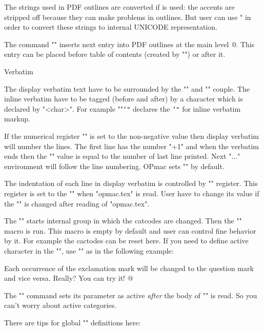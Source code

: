 The strings used in PDF outlines are converted if \csplain{} is used: the
accents are stripped off because they can make problems in outlines. But
user can use " in order to convert these strings to internal
UNICODE representation.

The command "" inserts next entry into PDF outlines at
the main level~0. This entry can be placed before table of contents (created
by "\outlines") or after it.


\sec Verbatim

The display verbatim text have to be surrounded by the "\begtt" and
"\endtt" couple. 
The inline verbatim have to be tagged (before and after) 
by a character which is declared by
"\activettchar<char>". For example "\activettchar"{\tt\char`"} 
declares the
{\tt\char`"} for inline verbatim markup. 

If the numerical register "\ttline" is set to the non-negative value then
display verbatim will number the lines. The first line has the number
"\ttline+1" and when the verbatim ends then the "\ttline" value is equal to the
number of last line printed. Next "\begtt...\endtt" environment will follow
the line numbering. OPmac sets "" by default.

The indentation of each line in display verbatim is controlled by
"\ttindent" register. This register is set to the "\parindent" when
"opmac.tex" is read. User have to change its value if the "\parindent" is
changed after reading of "opmac.tex".

The "\begtt" starts internal group in which the catcodes are changed. Then
the "\tthook" macro is run. This macro is empty by default and user can
control fine behavior by it. For example the cactodes can be reset here. If
you need to define active character in the "\tthook", use "\adef" as in the
following example:

{\def\tthook{\adef@{\string\endtt}}
\begtt
\def\tthook{\adef!{?}\adef?{!}}
\begtt
Each occurrence of the exclamation mark will be changed to 
the question mark and vice versa. Really? You can try it! 
@
\endtt
}

The "\adef" command sets its parameter as active {\it after\/}
the body of "\tthook" is read. So you can't worry about active
categories. 

There are tips for global "\tthook" definitions here:

\begtt
\def\tthook{\typosize[9/11]}     %
\def\tthook{\ttline=0}           %
\def\tthook{\adef{ }{\char`\ }}  %
\endtt


